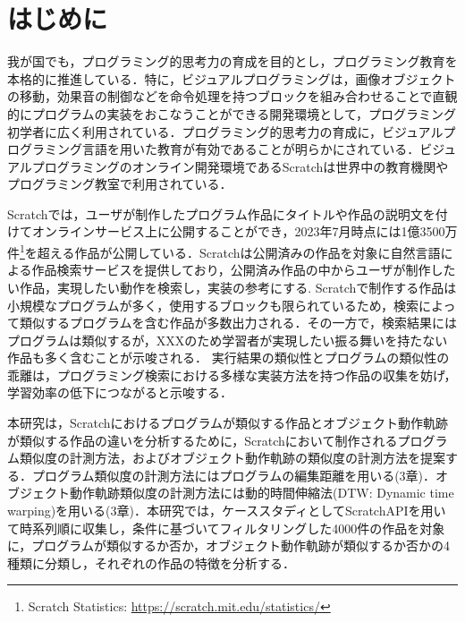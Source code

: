 \documentclass[T,J]{fose} %
\newcommand{\todo}[1]{\colorbox{yellow}{{\bf TODO}:}{\color{red} {\textbf{[#1]}}}}
\begin{document}
\section{はじめに}
我が国でも，プログラミング的思考力の育成を目的とし，プログラミング教育を本格的に推進している．特に，ビジュアルプログラミングは，画像オブジェクトの移動，効果音の制御などを命令処理を持つブロックを組み合わせることで直観的にプログラムの実装をおこなうことができる開発環境として，プログラミング初学者に広く利用されている．プログラミング的思考力の育成に，ビジュアルプログラミング言語を用いた教育が有効であることが明らかにされている\cite{}\cite{}．ビジュアルプログラミングのオンライン開発環境であるScratchは世界中の教育機関やプログラミング教室で利用されている．

Scratchでは，ユーザが制作したプログラム作品にタイトルや作品の説明文を付けてオンラインサービス上に公開することができ，2023年7月時点には1億3500万件\footnote{Scratch Statistics: \url{https://scratch.mit.edu/statistics/}}を超える作品が公開している．Scratchは公開済みの作品を対象に自然言語による作品検索サービスを提供しており，公開済み作品の中からユーザが制作したい作品，実現したい動作を検索し，実装の参考にする\cite{}.
Scratchで制作する作品は小規模なプログラムが多く，使用するブロックも限られているため，検索によって類似するプログラムを含む作品が多数出力される．その一方で，検索結果にはプログラムは類似するが，XXXのため学習者が実現したい振る舞いを持たない作品も多く含むことが示唆される．
実行結果の類似性とプログラムの類似性の乖離は，プログラミング検索における多様な実装方法を持つ作品の収集を妨げ，学習効率の低下につながると示唆する．

本研究は，Scratchにおけるプログラムが類似する作品とオブジェクト動作軌跡が類似する作品の違いを分析するために，Scratchにおいて制作されるプログラム類似度の計測方法，およびオブジェクト動作軌跡の類似度の計測方法を提案する．プログラム類似度の計測方法にはプログラムの編集距離を用いる(3章)．オブジェクト動作軌跡類似度の計測方法には動的時間伸縮法(DTW: Dynamic time warping)を用いる(3章)．本研究では，ケーススタディとしてScratchAPIを用いて時系列順に収集し，条件に基づいてフィルタリングした4000件の作品を対象に，プログラムが類似するか否か，オブジェクト動作軌跡が類似するか否かの4種類に分類し，それぞれの作品の特徴を分析する．
\end{document}

